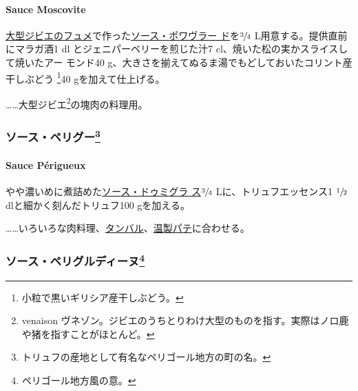 \hypertarget{sauce-moscovite}{%
\paragraph{Sauce Moscovite}\label{sauce-moscovite}}


\protect\hyperlink{fonds-de-gibier}{大型ジビエのフュメ}で作った\protect\hyperlink{sauce-poivrade}{ソース・ポワヴラー
ド}を\(\sfrac{3}{4}\) L用意する。提供直前にマラガ酒1 dl
とジェニパーベリーを煎じた汁7 cl、焼いた松の実かスライスして焼いたアー
モンド40 g、大きさを揃えてぬるま湯でもどしておいたコリント産干しぶどう
\footnote{小粒で黒いギリシア産干しぶどう。}40 gを加えて仕上げる。

\ldots{}\ldots{}大型ジビエ\footnote{venaison
  ヴネゾン。ジビエのうちとりわけ大型のものを指す。実際はノロ鹿や猪を指すことがほとんど。}の塊肉の料理用。

\maeaki

\hypertarget{ux30bdux30fcux30b9ux30daux30eaux30b0ux30fc59}{%
\subsubsection[ソース・ペリグー]{\texorpdfstring{ソース・ペリグー\footnote{トリュフの産地として有名なペリゴール地方の町の名。}}{ソース・ペリグー}}\label{ux30bdux30fcux30b9ux30daux30eaux30b0ux30fc59}}

\hypertarget{sauce-perigueux}{%
\paragraph{Sauce Périgueux}\label{sauce-perigueux}}


やや濃いめに煮詰めた\protect\hyperlink{sauce-demi-glace}{ソース・ドゥミグラ
ス}\(\sfrac{3}{4}\) Lに、トリュフエッセンス1 \(\sfrac{1}{2}\)
dlと細かく刻んだトリュフ100 gを加える。

\ldots{}\ldots{}いろいろな肉料理、\href{}{タンバル}、\href{}{温製パテ}に合わせる。

\maeaki

\hypertarget{ux30bdux30fcux30b9ux30daux30eaux30b0ux30ebux30c7ux30a3ux30fcux30cc60}{%
\subsubsection[ソース・ペリグルディーヌ]{\texorpdfstring{ソース・ペリグルディーヌ\footnote{ペリゴール地方風の意。}}{ソース・ペリグルディーヌ}}\label{ux30bdux30fcux30b9ux30daux30eaux30b0ux30ebux30c7ux30a3ux30fcux30cc60}}

